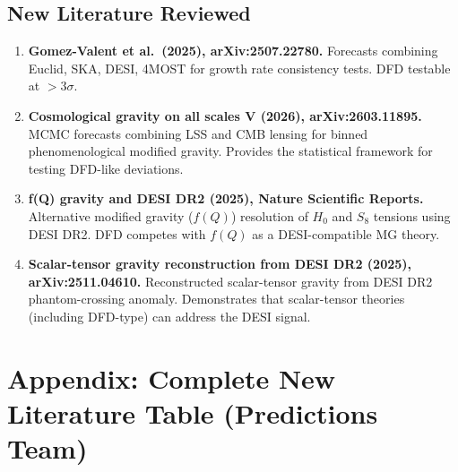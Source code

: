 \documentclass[11pt]{article}
\begin{document}
\subsection{New Literature Reviewed}

\begin{tcolorbox}[colback=green!5!white, colframe=green!50!black,
  title=\textbf{Agent 15: NEW LITERATURE REVIEWED}]

\begin{enumerate}

\item \textbf{Gomez-Valent et al.\ (2025), arXiv:2507.22780.}
  Forecasts combining Euclid, SKA, DESI, 4MOST for growth rate
  consistency tests. DFD testable at $> 3\sigma$.

\item \textbf{Cosmological gravity on all scales V (2026),
  arXiv:2603.11895.}
  MCMC forecasts combining LSS and CMB lensing for binned
  phenomenological modified gravity. Provides the statistical
  framework for testing DFD-like deviations.

\item \textbf{f(Q) gravity and DESI DR2 (2025), Nature Scientific
  Reports.}
  Alternative modified gravity ($f(Q)$) resolution of $H_0$ and
  $S_8$ tensions using DESI DR2. DFD competes with $f(Q)$ as
  a DESI-compatible MG theory.

\item \textbf{Scalar-tensor gravity reconstruction from DESI DR2
  (2025), arXiv:2511.04610.}
  Reconstructed scalar-tensor gravity from DESI DR2 phantom-crossing
  anomaly. Demonstrates that scalar-tensor theories (including
  DFD-type) can address the DESI signal.

\end{enumerate}
\end{tcolorbox}


\section{Appendix: Complete New Literature Table (Predictions Team)}
\end{document}

